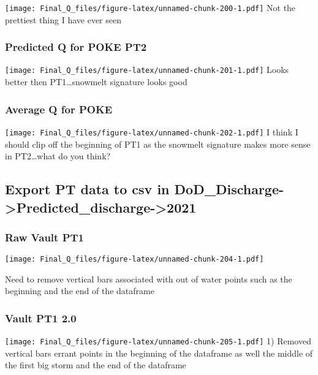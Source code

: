 \documentclass[
]{article}
\begin{document}
\texttt{[image: Final\_Q\_files/figure-latex/unnamed-chunk-200-1.pdf]} Not
the prettiest thing I have ever seen

\hypertarget{predicted-q-for-poke-pt2}{%
\subsubsection{Predicted Q for POKE
PT2}\label{predicted-q-for-poke-pt2}}

\texttt{[image: Final\_Q\_files/figure-latex/unnamed-chunk-201-1.pdf]}
Looks better then PT1\ldots snowmelt signature looks good

\hypertarget{average-q-for-poke}{%
\subsubsection{Average Q for POKE}\label{average-q-for-poke}}

\texttt{[image: Final\_Q\_files/figure-latex/unnamed-chunk-202-1.pdf]} I
think I should clip off the beginning of PT1 as the snowmelt signature
makes more sense in PT2\ldots what do you think?

\hypertarget{export-pt-data-to-csv-in-dod_discharge-predicted_discharge-2021-2}{%
\subsection{Export PT data to csv in
DoD\_Discharge-\textgreater Predicted\_discharge-\textgreater2021}\label{export-pt-data-to-csv-in-dod_discharge-predicted_discharge-2021-2}}

\hypertarget{raw-vault-pt1-2}{%
\subsubsection{Raw Vault PT1}\label{raw-vault-pt1-2}}

\texttt{[image: Final\_Q\_files/figure-latex/unnamed-chunk-204-1.pdf]}

Need to remove vertical bars associated with out of water points such as
the beginning and the end of the dataframe

\hypertarget{vault-pt1-2.0-1}{%
\subsubsection{Vault PT1 2.0}\label{vault-pt1-2.0-1}}

\texttt{[image: Final\_Q\_files/figure-latex/unnamed-chunk-205-1.pdf]} 1)
Removed vertical bars errant points in the beginning of the dataframe as
well the middle of the first big storm and the end of the dataframe
\end{document}
